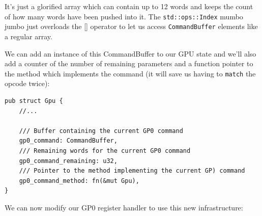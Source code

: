 \documentclass[a4paper]{article}
\newcommand{\code}[1] {\texttt{#1}}
\begin{document}
It's just a glorified array which can contain up to 12 words and keeps
the count of how many words have been pushed into it. The
\code{std::ops::Index} mumbo jumbo just overloads the [] operator to
let us access \code{CommandBuffer} elements like a regular array.

We can add an instance of this CommandBuffer to our GPU state and
we'll also add a counter of the number of remaining parameters and a
function pointer to the method which implements the command (it will
save us having to \code{match} the opcode twice):

\begin{lstlisting}
pub struct Gpu {
    //...

    /// Buffer containing the current GP0 command
    gp0_command: CommandBuffer,
    /// Remaining words for the current GP0 command
    gp0_command_remaining: u32,
    /// Pointer to the method implementing the current GP) command
    gp0_command_method: fn(&mut Gpu),
}
\end{lstlisting}

We can now modify our GP0 register handler to use this new
infrastructure:
\end{document}

